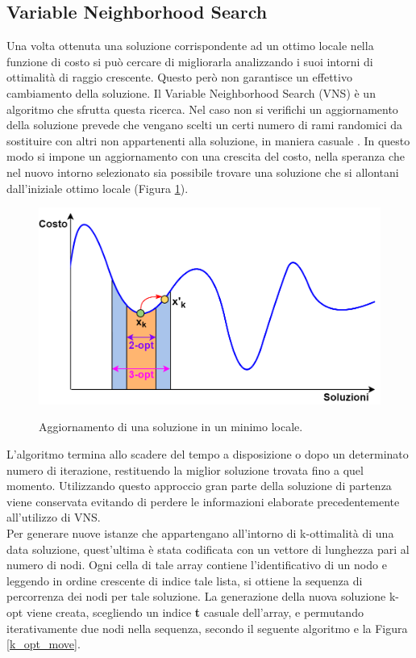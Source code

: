 \subsection{Variable Neighborhood Search}
Una volta ottenuta una soluzione corrispondente ad un ottimo locale nella funzione di costo si può cercare di migliorarla analizzando i suoi intorni di ottimalità di raggio crescente. Questo però non garantisce un effettivo cambiamento della soluzione. Il Variable Neighborhood Search (VNS) è un algoritmo che sfrutta questa ricerca. Nel caso non si verifichi un aggiornamento della soluzione prevede che vengano scelti un certi numero di rami randomici da sostituire con altri non appartenenti alla soluzione, in maniera casuale \cite{VNS}. In questo modo si impone un aggiornamento con una crescita del costo, nella speranza che nel nuovo intorno selezionato sia possibile trovare una soluzione che si allontani dall'iniziale ottimo locale (Figura \ref{VNS_img}).\\
 \begin{figure}[H] 
\begin{center} 
  \includegraphics[scale=0.4]{Images/VNS}\\ 
  \caption{\footnotesize{Aggiornamento di una soluzione in un minimo locale.}}
  \label{VNS_img}
\end{center}
\end{figure}
L'algoritmo termina allo scadere del tempo a disposizione o dopo un determinato numero di iterazione, restituendo la miglior soluzione trovata fino a quel momento. Utilizzando questo approccio gran parte della soluzione di partenza viene conservata evitando di perdere le informazioni elaborate precedentemente all'utilizzo di VNS.\\
Per generare nuove istanze che appartengano all'intorno di k-ottimalità di una data soluzione, quest'ultima è stata codificata con un vettore di lunghezza pari al numero di nodi. Ogni cella di tale array contiene l'identificativo di un nodo e leggendo in ordine crescente di indice tale lista, si ottiene la sequenza di percorrenza dei nodi per tale soluzione. La generazione della nuova soluzione k-opt viene creata, scegliendo un indice \textbf{t} casuale dell'array, e permutando iterativamente due nodi nella sequenza, secondo il seguente algoritmo\cite{hybrid_VNS} e la Figura \ref{k_opt_move}.\\
